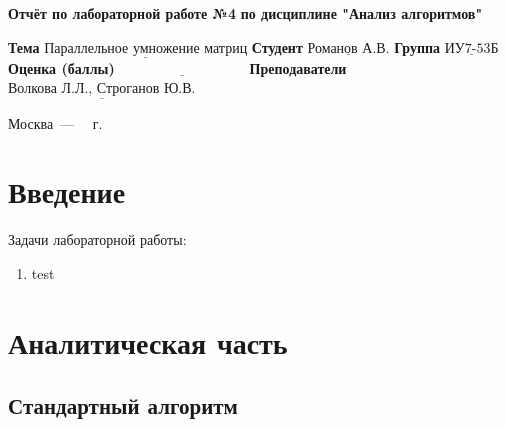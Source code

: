 \documentclass[12pt]{report}
\begin{document}
\begin{titlepage}
	
	\begin{center}
		\noindent\begin{minipage}{1.3\textwidth}\centering
			\Large\textbf{  Отчёт по лабораторной работе №4}\newline
			\textbf{по дисциплине "Анализ алгоритмов"}\newline\newline
		\end{minipage}
	\end{center}
	
	\noindent\textbf{Тема} $\underline{\text{Параллельное умножение матриц}}$\newline\newline
	\noindent\textbf{Студент} $\underline{\text{Романов А.В.}}$\newline\newline
	\noindent\textbf{Группа} $\underline{\text{ИУ7-53Б}}$\newline\newline
	\noindent\textbf{Оценка (баллы)} $\underline{\text{~~~~~~~~~~~~~~~~~~~~~~~~~~~}}$\newline\newline
	\noindent\textbf{Преподаватели} $\underline{\text{Волкова Л.Л., Строганов Ю.В.}}$\newline\newline\newline
	
	\begin{center}
		\vfill
		Москва~---~\the\year
		~г.
	\end{center}
\end{titlepage}


\tableofcontents

\newpage
\chapter*{Введение}


Задачи лабораторной работы:

\begin{enumerate}
	\item test
\end{enumerate}

\chapter{Аналитическая часть}


\section{Стандартный алгоритм}
\end{document}
